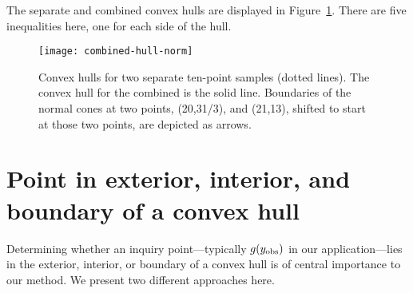 The separate and combined convex hulls are displayed in Figure~\ref{F:combined-hull}.
There are five inequalities here, one for each side of the hull.
\begin{figure}[h]
\begin{center}
\texttt{[image: combined-hull-norm]}
\end{center}
\caption[Convex hulls for two separate ten-point samples]
{Convex hulls for two separate ten-point samples (dotted lines).  The 
convex hull for the combined is the solid line.  Boundaries of the normal cones
at two points, (20,31/3), and (21,13), shifted to start at those two points, are depicted as arrows.}
\label{F:combined-hull}
\end{figure}


\section{Point in exterior, interior, and boundary of a convex hull}
Determining whether an inquiry point---typically $g(y_{\text{obs}})$ in our application---lies
 in the exterior, interior, or boundary of a convex hull is of central 
 importance to our method.  
We present two different approaches here.


